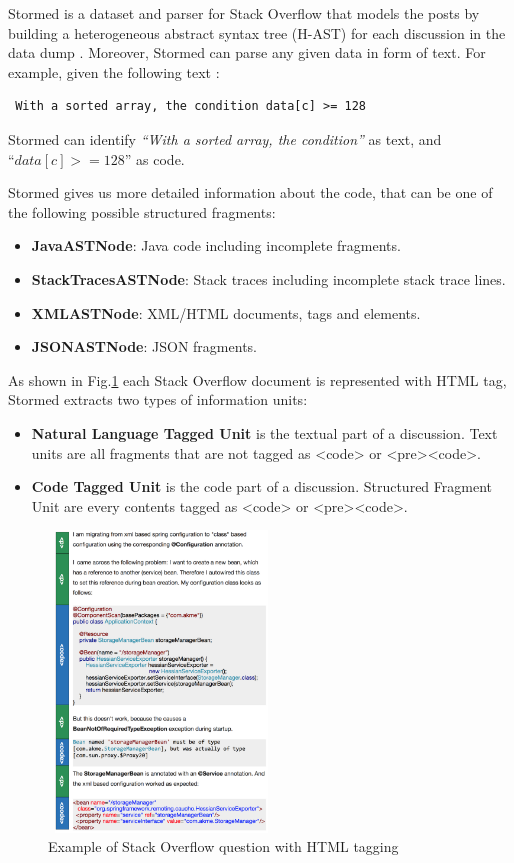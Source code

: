 \documentclass[12pt,mscthesis]{usiinfthesis}
\begin{document}
	 Stormed is a dataset and parser for Stack Overflow that models the posts by building a heterogeneous abstract syntax tree (H-AST) for each discussion in the data dump \cite{Ponz2015a}.
	 Moreover, Stormed can parse any given data in form of text. For example, given the following text : 
	 \begin{verbatim} With a sorted array, the condition data[c] >= 128  \end{verbatim} 
	 Stormed can identify  \emph{``With a sorted array, the condition''} as text, and \\``$data[c] >= 128$'' as code. 


	 Stormed gives us more detailed information about the code, that can be one of the following possible structured fragments:
	 \begin{itemize}
	 \item \textbf{JavaASTNode}: Java code including incomplete fragments.
	 \item \textbf{StackTracesASTNode}: Stack traces including incomplete stack trace lines.
	 \item \textbf{XMLASTNode}: XML/HTML documents, tags and elements.
	 \item \textbf{JSONASTNode}: JSON fragments.
	 \end{itemize}

	  As shown in Fig.\cref{stackOverflow} each Stack Overflow document is represented with HTML tag, Stormed extracts two types of information units:
	 	 \begin{itemize}
		\item \textbf{Natural Language Tagged Unit} is the textual part of a discussion. Text units are all fragments that are not tagged as <code> or <pre><code>.	
		\item \textbf{Code Tagged Unit} is the code part of a discussion. Structured Fragment Unit are every contents tagged as <code> or <pre><code>.
	 \end{itemize}


	\begin{figure}[htbp]
	 \centering
	\includegraphics[width=6cm,height=8cm]{stackOverflow}
	\caption{Example of Stack Overflow question with HTML tagging}
	\label{stackOverflow}
	\end{figure}
\end{document}
